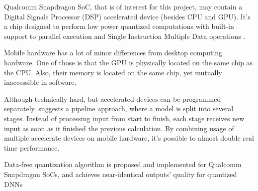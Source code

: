 Qualcomm Snapdragon SoC, that is of interest for this project, may contain a Digital Signals Processor (DSP) accelerated device (besides CPU and GPU). It's a chip designed to perform low power quantized computations with built-in support to parallel execution and Single Instruction Multiple Data operations \cite{speed:online-dsp-qualcomm}.

Mobile hardware has a lot of minor differences from desktop computing hardware. One of those is that the GPU is physically located on the same chip as the CPU. Also, their memory is located on the same chip, yet mutually inaccessible in software.

Although technically hard, but accelerated devices can be programmed separately. \cite{mobile:pipelining20} suggests a pipeline approach, where a model is split into several stages. Instead of processing input from start to finish, each stage receives new input as soon as it finished the previous calculation. By combining usage of multiple accelerate devices on mobile hardware, it's possible to almost double real time performance.

 Data-free quantization \cite{speed:datafreequant19} algorithm is proposed and implemented for Qualcomm Snapdragon SoCs, and achieves near-identical outputs' quality for quantized DNNs

